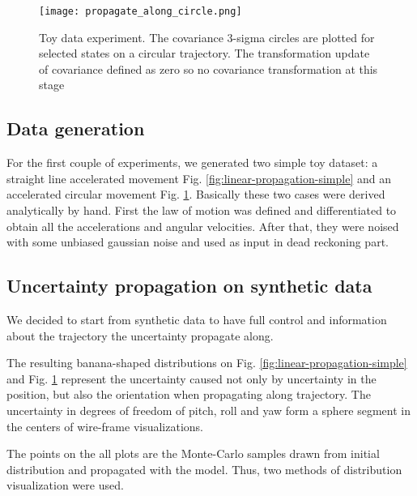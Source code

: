 \documentclass{article}
\begin{document}



\begin{figure}
	\texttt{[image: propagate\_along\_circle.png]}
	
	\caption{Toy data experiment. The covariance 3-sigma circles are plotted for selected states on a circular trajectory. The transformation update of covariance defined as zero so no covariance transformation at this stage}
	\label{fig:circular}
\end{figure}

\subsection{Data generation}

For the first couple of experiments, we generated two simple toy dataset: a straight line accelerated movement Fig. \ref{fig:linear-propagation-simple} and an accelerated circular movement Fig. \ref{fig:circular}. Basically these two cases were derived analytically by hand. First the law of motion was defined and differentiated to obtain all the accelerations and angular velocities. After that, they were noised with some unbiased gaussian noise and used as input in dead reckoning part.

\subsection{Uncertainty propagation on synthetic data}

We decided to start from synthetic data to have full control and information about the trajectory the uncertainty propagate along.

The resulting banana-shaped distributions on Fig. \ref{fig:linear-propagation-simple} and Fig. \ref{fig:circular} represent the uncertainty caused not only by uncertainty in the position, but also the orientation when propagating along trajectory. The uncertainty in degrees of freedom of pitch, roll and yaw form a sphere segment in the centers of wire-frame visualizations. 

The points on the all plots are the Monte-Carlo samples drawn from initial distribution and propagated with the model. Thus, two methods of distribution visualization were used.
\end{document}
